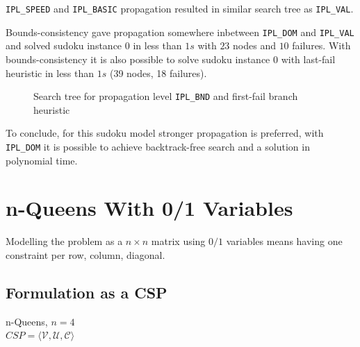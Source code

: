 \documentclass[a4paper, 11pt]{article}
\begin{document}
\texttt{IPL\_SPEED} and \texttt{IPL\_BASIC} propagation resulted in similar search tree as \texttt{IPL\_VAL}.

Bounds-consistency gave propagation somewhere inbetween \texttt{IPL\_DOM} and \texttt{IPL\_VAL} and solved sudoku instance $0$ in less than $1s$ with $23$ nodes and $10$ failures. With bounds-consistency it is also possible to solve sudoku instance $0$ with last-fail heuristic in less than $1s$ (39 nodes, 18 failures).

\begin{figure}[H]
  \begin{center}
    \caption{Search tree for propagation level \texttt{IPL\_BND} and first-fail branch heuristic}
    \label{fig:bnd_ff}
  \end{center}
\end{figure}

To conclude, for this sudoku model stronger propagation is preferred, with \texttt{IPL\_DOM} it is possible to achieve backtrack-free search and a solution in polynomial time. 

\section*{n-Queens With 0/1 Variables}
Modelling the problem as a $n \times n$ matrix using $0/1$ variables means having one constraint per row, column, diagonal. 
\subsection*{Formulation as a CSP}
n-Queens, $n = 4$\\
$CSP = \langle \mathcal{V}, \mathcal{U}, \mathcal{C} \rangle$
\end{document}
